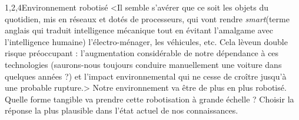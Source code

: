 \begin{quiz}[title={Robotique et intelligence artificielle}]
\begin{quizquestion*}[b]{3}{1,2,4}{Environnement robotisé}
<Il semble s'avérer que ce soit les objets du quotidien, mis en réseaux et dotés de processeurs, qui vont rendre \textit{smart}\linebreak (terme anglais qui traduit intelligence mécanique tout en évitant l'amalgame avec l'intelligence humaine) l'électro-ménager, les véhicules, etc.
Cela lève\linebreak un double risque préoccupant : l'augmentation considérable de notre dépendance à ces technologies (saurons-nous toujours conduire manuellement une voiture dans quelques années ?) et l'impact environnemental qui ne cesse de croître jusqu'à une probable rupture.>
Notre environnement va être de plus en plus robotisé. Quelle forme tangible va prendre cette robotisation à grande échelle ?
Choisir la réponse la plus plausible dans l'état actuel de nos connaissances.
\end{quizquestion*}
\end{quiz}

